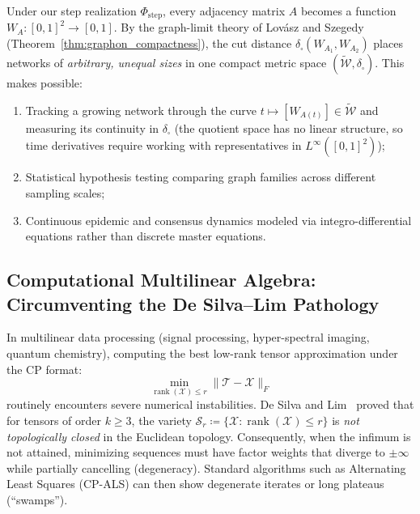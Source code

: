 \documentclass[11pt,a4paper,reqno]{amsart}
\theoremstyle{definition}
\numberwithin{equation}{section}
\newcommand{\rank}{\operatorname{rank}}
\begin{document}
Under our step realization $\Phi_{\mathrm{step}}$, every adjacency matrix $A$ becomes a function $W_A \colon [0, 1]^2 \to [0, 1]$. By the graph-limit theory of Lov\'asz and Szegedy (Theorem~\ref{thm:graphon_compactness}), the cut distance $\delta_\square(W_{A_1}, W_{A_2})$ places networks of \emph{arbitrary, unequal sizes} in one compact metric space $(\widetilde{\mathcal{W}}, \delta_\square)$. This makes possible:
\begin{enumerate}[label=(\roman*)]
    \item Tracking a growing network through the curve $t \mapsto [W_{A(t)}] \in \widetilde{\mathcal{W}}$ and measuring its continuity in $\delta_\square$ (the quotient space has no linear structure, so time derivatives require working with representatives in $L^\infty([0,1]^2)$);
    \item Statistical hypothesis testing comparing graph families across different sampling scales;
    \item Continuous epidemic and consensus dynamics modeled via integro-differential equations rather than discrete master equations.
\end{enumerate}

\subsection{Computational Multilinear Algebra: Circumventing the De Silva--Lim Pathology}
\label{subsec:imp_tensors}
In multilinear data processing (signal processing, hyper-spectral imaging, quantum chemistry), computing the best low-rank tensor approximation under the CP format:
\begin{equation}
    \min_{\rank(\mathcal{X}) \le r} \|\mathcal{T} - \mathcal{X}\|_F
\end{equation}
routinely encounters severe numerical instabilities. De Silva and Lim~\cite{desilva2008illposed} proved that for tensors of order $k \ge 3$, the variety $\mathcal{S}_r \coloneqq \{\mathcal{X} \colon \rank(\mathcal{X}) \le r\}$ is \emph{not topologically closed} in the Euclidean topology. Consequently, when the infimum is not attained, minimizing sequences must have factor weights that diverge to $\pm\infty$ while partially cancelling (degeneracy). Standard algorithms such as Alternating Least Squares (CP-ALS) can then show degenerate iterates or long plateaus (``swamps'').
\end{document}
